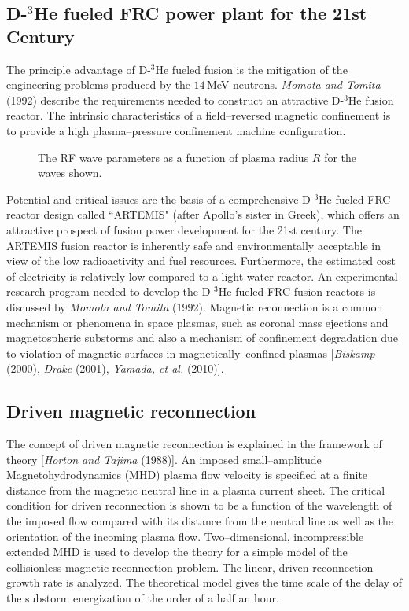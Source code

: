 \documentclass[a4paper,openany,12pt]{book}
\begin{document}
\subsection{D-$^3$He fueled FRC power plant for the 21st Century}

The principle advantage of D-$^3$He fueled fusion is the mitigation of the engineering problems produced by the $14\,$MeV neutrons. \emph{Momota and Tomita} (1992) describe the requirements needed to construct an attractive D-$^3$He fusion reactor. The intrinsic characteristics of a field--reversed magnetic confinement is to provide a high plasma--pressure confinement machine configuration.

\begin{figure}[H]
\centerline{}
\caption{The RF wave parameters as a function of plasma radius $R$ for the waves shown.}
\label{F3.9}
\end{figure}
%

Potential and critical issues are the basis of a comprehensive D-$^3$He fueled FRC reactor design called ``ARTEMIS" (after Apollo's sister in Greek), which offers an attractive prospect of fusion power development for the 21st century. The ARTEMIS fusion reactor is inherently safe and environmentally acceptable in view of the low radioactivity and fuel resources. Furthermore, the estimated cost of electricity is relatively low compared to a light water reactor. An experimental research program needed to develop the D-$^3$He fueled FRC fusion reactors is discussed by \emph{Momota and Tomita} (1992). Magnetic reconnection is a common mechanism or phenomena in space plasmas, such as coronal mass ejections and magnetospheric substorms and also a mechanism of confinement degradation due to violation of magnetic surfaces in magnetically--confined plasmas [\emph{Biskamp} (2000), \emph{Drake} (2001), \emph{Yamada, et al.} (2010)].

\subsection{Driven magnetic reconnection}

The concept of driven magnetic reconnection is explained in the framework of theory [\emph{Horton and Tajima} (1988)]. An imposed small--amplitude Magnetohydrodynamics (MHD) plasma flow velocity is specified at a finite distance from the magnetic neutral line in a plasma current sheet. The critical condition for driven reconnection is shown to be a function of the wavelength of the imposed flow compared with its distance from the neutral line as well as the orientation of the incoming plasma flow. Two--dimensional, incompressible extended MHD is used to develop the theory for a simple model of the collisionless magnetic reconnection problem. The linear, driven reconnection growth rate is analyzed. The theoretical model gives the time scale of the delay of the substorm energization of the order of a half an hour.
\end{document}
